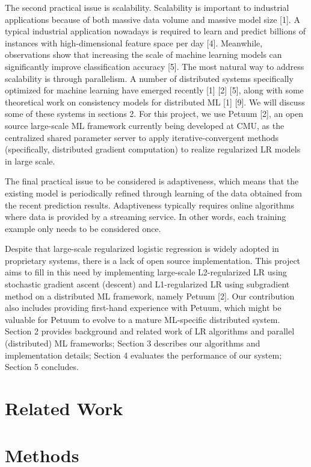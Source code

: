 \documentclass{article} %
\begin{document}
The second practical issue is scalability. Scalability is important to industrial applications because of both massive data volume and massive model size [1]. A typical industrial application nowadays is required to learn and predict billions of instances with high-dimensional feature space per day [4]. Meanwhile, observations show that increasing the scale of machine learning models can significantly improve classification accuracy [5]. The most natural way to address scalability is through parallelism. A number of distributed systems specifically optimized for machine learning have emerged recently [1] [2] [5], along with some theoretical work on consistency models for distributed ML [1] [9]. We will discuss some of these systems in sections 2. For this project, we use Petuum [2], an open source large-scale ML framework currently being developed at CMU, as the centralized shared parameter server to apply iterative-convergent methods (specifically, distributed gradient computation) to realize regularized LR models in large scale.

The final practical issue to be considered is adaptiveness, which means that the existing model is periodically refined through learning of the data obtained from the recent prediction results. Adaptiveness typically requires online algorithms where data is provided by a streaming service. In other words, each training example only needs to be considered once.

Despite that large-scale regularized logistic regression is widely adopted in proprietary systems, there is a lack of open source implementation. This project aims to fill in this need by implementing large-scale L2-regularized LR using stochastic gradient ascent (descent) and L1-regularized LR using subgradient method on a distributed ML framework, namely Petuum [2]. Our contribution also includes providing first-hand experience with Petuum, which might be valuable for Petuum to evolve to a mature ML-specific distributed system. Section 2 provides background and related work of LR algorithms and parallel (distributed) ML frameworks; Section 3 describes our algorithms and implementation details; Section 4 evaluates the performance of our system; Section 5 concludes. 

\section{Related Work}
\label{gen_inst}



\section{Methods}
\label{headings}
\end{document}
